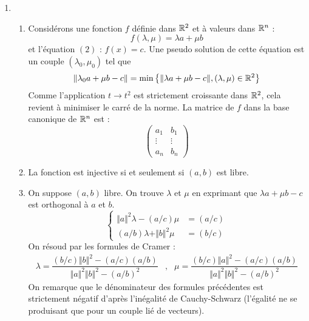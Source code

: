 \begin{enumerate}
\item \begin{enumerate}
 \item Considérons une fonction $f$ définie dans $\mathbb{R}^2$ et à valeurs dans $\mathbb{R}^n$ :
\begin{displaymath}
 f(\lambda,\mu) = \lambda a + \mu b
\end{displaymath}
et l'équation $(2)$ : $f(x)=c$. Une pseudo solution de cette équation est un couple $(\lambda_0,\mu_0)$ tel que
\begin{displaymath}
 \Vert \lambda_0 a + \mu b -c \Vert = \min 
\left\lbrace
\Vert \lambda a + \mu b -c \Vert , (\lambda, \mu) \in \mathbb{R}^2
 \right\rbrace 
\end{displaymath}
Comme l'application $t \rightarrow t^2$ est strictement croissante dans $\mathbb{R}^2$, cela revient à minimiser le carré de la norme. La matrice de $f$ dans la base canonique de $\mathbb{R}^n$ est :
\begin{displaymath}
 \begin{pmatrix}
  a_1 & b_1 \\
 \vdots & \vdots \\
 a_n & b_n
 \end{pmatrix}
\end{displaymath}
\item La fonction est injective si et seulement si $(a,b)$ est libre.
\item On suppose $(a,b)$ libre. On trouve $\lambda$ et $\mu$ en exprimant que $\lambda a +\mu b -c$ est orthogonal à $a$ et $b$.
\begin{displaymath}
 \left\lbrace 
\begin{aligned}
 \Vert a \Vert^2 \lambda - (a/c) \mu &= (a/c) \\
 (a/b)\lambda + \Vert b \Vert ^2 \mu &= (b/c)
\end{aligned}
\right. 
\end{displaymath}
On résoud par les formules de Cramer :
\begin{align*}
 \lambda = \dfrac{(b/c)\Vert b \Vert^2-(a/c)(a/b)}{\Vert a \Vert^2 \Vert b \Vert^2 -(a/b)^2}
&,&
 \mu = \dfrac{(b/c)\Vert a \Vert^2-(a/c)(a/b)}{\Vert a \Vert^2 \Vert b \Vert^2 -(a/b)^2}
\end{align*}
On remarque que le dénominateur des formules précédentes est strictement négatif d'après l'inégalité de Cauchy-Schwarz (l'égalité ne se produisant que pour un couple lié de vecteurs).
\end{enumerate}

\end{enumerate}

